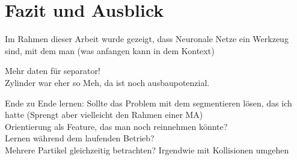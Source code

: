 \chapter{Fazit und Ausblick}


Im Rahmen dieser Arbeit wurde gezeigt, dass Neuronale Netze ein Werkzeug sind, mit dem man (was anfangen kann in dem Kontext)


Mehr daten für separator!\\
Zylinder war eher so Meh, da ist noch ausbaupotenzial.


Ende zu Ende lernen: Sollte das Problem mit dem segmentieren lösen, das ich hatte
(Sprengt aber vielleicht den Rahmen einer MA)\\
Orientierung als Feature, das man noch reinnehmen könnte?\\
Lernen während dem laufenden Betrieb?\\
Mehrere Partikel gleichzeitig betrachten? Irgendwie mit Kollisionen umgehen